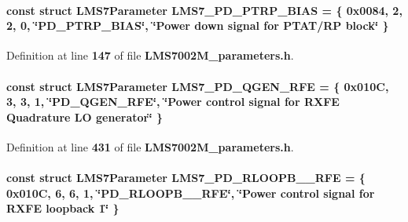 \paragraph[{L\+M\+S7\+\_\+\+P\+D\+\_\+\+P\+T\+R\+P\+\_\+\+B\+I\+AS}]{\setlength{\rightskip}{0pt plus 5cm}const struct {\bf L\+M\+S7\+Parameter} L\+M\+S7\+\_\+\+P\+D\+\_\+\+P\+T\+R\+P\+\_\+\+B\+I\+AS = \{ 0x0084, 2, 2, 0, \char`\"{}\+P\+D\+\_\+\+P\+T\+R\+P\+\_\+\+B\+I\+A\+S\char`\"{}, \char`\"{}\+Power down signal for P\+T\+A\+T/\+R\+P block\char`\"{} \}\hspace{0.3cm}{\ttfamily [static]}}\label{LMS7002M__parameters_8h_a18bb731e0ce6adee83da4bac9974798e}


Definition at line {\bf 147} of file {\bf L\+M\+S7002\+M\+\_\+parameters.\+h}.

\paragraph[{L\+M\+S7\+\_\+\+P\+D\+\_\+\+Q\+G\+E\+N\+\_\+\+R\+FE}]{\setlength{\rightskip}{0pt plus 5cm}const struct {\bf L\+M\+S7\+Parameter} L\+M\+S7\+\_\+\+P\+D\+\_\+\+Q\+G\+E\+N\+\_\+\+R\+FE = \{ 0x010\+C, 3, 3, 1, \char`\"{}\+P\+D\+\_\+\+Q\+G\+E\+N\+\_\+\+R\+F\+E\char`\"{}, \char`\"{}\+Power control signal for R\+X\+F\+E Quadrature L\+O generator\char`\"{} \}\hspace{0.3cm}{\ttfamily [static]}}\label{LMS7002M__parameters_8h_a129acd84360ba40c0d7870e0b01ac5b1}


Definition at line {\bf 431} of file {\bf L\+M\+S7002\+M\+\_\+parameters.\+h}.

\paragraph[{L\+M\+S7\+\_\+\+P\+D\+\_\+\+R\+L\+O\+O\+P\+B\+\_\+1\+\_\+\+R\+FE}]{\setlength{\rightskip}{0pt plus 5cm}const struct {\bf L\+M\+S7\+Parameter} L\+M\+S7\+\_\+\+P\+D\+\_\+\+R\+L\+O\+O\+P\+B\+\_\+\_\+\+R\+FE = \{ 0x010\+C, 6, 6, 1, \char`\"{}\+P\+D\+\_\+\+R\+L\+O\+O\+P\+B\+\_\+\_\+\+R\+F\+E\char`\"{}, \char`\"{}\+Power control signal for R\+X\+F\+E loopback 1\char`\"{} \}\hspace{0.3cm}{\ttfamily [static]}}\label{LMS7002M__parameters_8h_abad559e62a820320cfc33538a3ae8eff}



